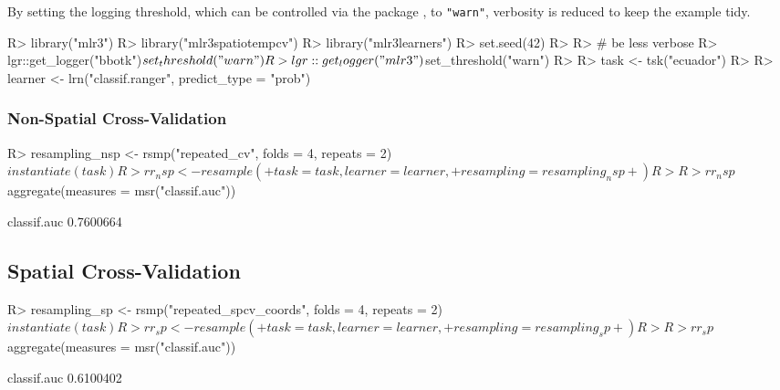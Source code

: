 \documentclass[
]{jss}
\begin{document}
By setting the logging threshold, which can be controlled via the
 package \citep{lgr}, to \texttt{"warn"}, verbosity is reduced
to keep the example tidy.

\begin{CodeChunk}
\begin{CodeInput}
R> library("mlr3")
R> library("mlr3spatiotempcv")
R> library("mlr3learners")
R> set.seed(42)
R> 
R> # be less verbose
R> lgr::get_logger("bbotk")$set_threshold("warn")
R> lgr::get_logger("mlr3")$set_threshold("warn")
R> 
R> task <- tsk("ecuador")
R> 
R> learner <- lrn("classif.ranger", predict_type = "prob")
\end{CodeInput}
\end{CodeChunk}

\hypertarget{non-spatial-cross-validation}{%
\subsubsection{Non-Spatial
Cross-Validation}\label{non-spatial-cross-validation}}

\begin{CodeChunk}
\begin{CodeInput}
R> resampling_nsp <- rsmp("repeated_cv", folds = 4, repeats = 2)$instantiate(task)
R> rr_nsp <- resample(
+   task = task, learner = learner,
+   resampling = resampling_nsp
+ )
R> 
R> rr_nsp$aggregate(measures = msr("classif.auc"))
\end{CodeInput}
\begin{CodeOutput}
classif.auc 
  0.7600664 
\end{CodeOutput}
\end{CodeChunk}

\hypertarget{spatial-cross-validation}{%
\subsection{Spatial Cross-Validation}\label{spatial-cross-validation}}

\begin{CodeChunk}
\begin{CodeInput}
R> resampling_sp <- rsmp("repeated_spcv_coords", folds = 4, repeats = 2)$instantiate(task)
R> rr_sp <- resample(
+   task = task, learner = learner,
+   resampling = resampling_sp
+ )
R> 
R> rr_sp$aggregate(measures = msr("classif.auc"))
\end{CodeInput}
\begin{CodeOutput}
classif.auc 
  0.6100402 
\end{CodeOutput}
\end{CodeChunk}
\end{document}
